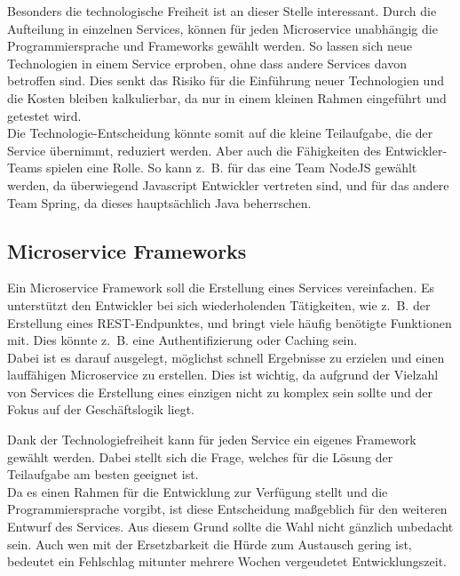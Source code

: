 Besonders die technologische Freiheit ist an dieser Stelle interessant. Durch die Aufteilung in einzelnen Services, können für jeden Microservice unabhängig die Programmiersprache und Frameworks gewählt werden. So lassen sich neue Technologien in einem Service erproben, ohne dass andere Services davon betroffen sind. Dies senkt das Risiko für die Einführung neuer Technologien und die Kosten bleiben kalkulierbar\cite[13]{Wolff2015}, da nur in einem kleinen Rahmen eingeführt und getestet wird.\\
Die Technologie-Entscheidung könnte somit auf die kleine Teilaufgabe, die der Service übernimmt, reduziert werden. Aber auch die Fähigkeiten des Entwickler-Teams spielen eine Rolle. So kann z.~B. für das eine Team NodeJS gewählt werden, da überwiegend Javascript Entwickler vertreten sind, und für das andere Team Spring, da dieses hauptsächlich Java beherrschen.

\subsection{Microservice Frameworks}

Ein Microservice Framework soll die Erstellung eines Services vereinfachen. Es unterstützt den Entwickler bei sich wiederholenden Tätigkeiten, wie z.~B. der Erstellung eines \ac{REST}-Endpunktes, und bringt viele häufig benötigte Funktionen mit. Dies könnte z.~B. eine Authentifizierung oder Caching sein.\\
Dabei ist es darauf ausgelegt, möglichst schnell Ergebnisse zu erzielen und einen lauffähigen Microservice zu erstellen. Dies ist wichtig, da aufgrund der Vielzahl von Services die Erstellung eines einzigen nicht zu komplex sein sollte und der Fokus auf der Geschäftslogik liegt. 

Dank der Technologiefreiheit kann für jeden Service ein eigenes Framework gewählt werden. Dabei stellt sich die Frage, welches für die Lösung der Teilaufgabe am besten geeignet ist. \\
Da es einen Rahmen für die Entwicklung zur Verfügung stellt und die Programmiersprache vorgibt, ist diese Entscheidung maßgeblich für den weiteren Entwurf des Services. Aus diesem Grund sollte die Wahl nicht gänzlich unbedacht sein. Auch wen mit der Ersetzbarkeit die Hürde zum Austausch gering ist, bedeutet ein Fehlschlag mitunter mehrere Wochen vergeudetet Entwicklungszeit.

